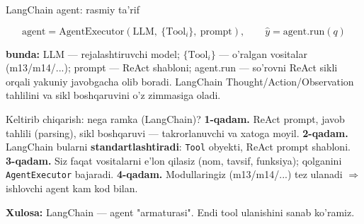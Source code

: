 \documentclass[aspectratio=169,11pt]{beamer}
\newcommand{\bunda}[1]{{\small\textbf{bunda:}\; #1}}
\begin{document}
\begin{frame}{LangChain agent: rasmiy ta'rif}
  \begin{tcolorbox}[defbox,title={Ta'rif: AgentExecutor}]
    \vspace{-0.4em}
    $$ \text{agent} = \mathrm{AgentExecutor}(\text{LLM},\ \{\text{Tool}_i\},\ \text{prompt}), \qquad
       \hat{y} = \text{agent.run}(q) $$
  \end{tcolorbox}
  \vspace{2pt}
  \bunda{LLM --- rejalashtiruvchi model; $\{\text{Tool}_i\}$ --- o'ralgan
  vositalar (m13/m14/...); prompt --- ReAct shabloni; agent.run --- so'rovni
  ReAct sikli orqali yakuniy javobgacha olib boradi.}
  \vspace{4pt}
  \footnotesize LangChain Thought/Action/Observation tahlilini va sikl
  boshqaruvini o'z zimmasiga oladi.
\end{frame}

\begin{frame}{Keltirib chiqarish: nega ramka (LangChain)?}
  \textbf{1-qadam.} ReAct prompt, javob tahlili (parsing), sikl boshqaruvi ---
  takrorlanuvchi va xatoga moyil.
  \pause
  \textbf{2-qadam.} LangChain bularni \textbf{standartlashtiradi}: \texttt{Tool}
  obyekti, ReAct prompt shabloni.
  \pause
  \textbf{3-qadam.} Siz faqat vositalarni e'lon qilasiz (nom, tavsif, funksiya);
  qolganini \texttt{AgentExecutor} bajaradi.
  \pause
  \textbf{4-qadam.} Modullaringiz (m13/m14/...) tez ulanadi $\Rightarrow$ ishlovchi
  agent kam kod bilan.
  \begin{tcolorbox}[okbox,top=2pt,bottom=2pt]
    \small \textbf{Xulosa:} LangChain --- agent "armaturasi". Endi tool ulanishini
    sanab ko'ramiz.
  \end{tcolorbox}
\end{frame}
\end{document}
